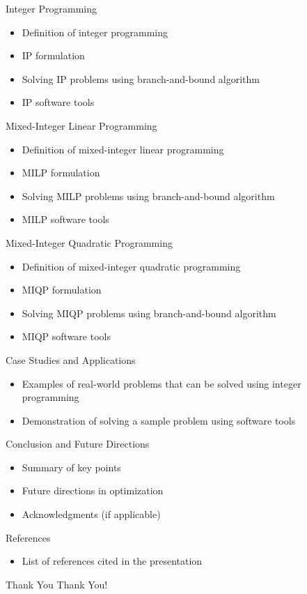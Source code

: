 \documentclass{beamer}
\begin{document}
\begin{frame}{Integer Programming}
  \begin{itemize}
    \item Definition of integer programming
    \item IP formulation
    \item Solving IP problems using branch-and-bound algorithm
    \item IP software tools
  \end{itemize}
\end{frame}

\begin{frame}{Mixed-Integer Linear Programming}
  \begin{itemize}
    \item Definition of mixed-integer linear programming
    \item MILP formulation
    \item Solving MILP problems using branch-and-bound algorithm
    \item MILP software tools
  \end{itemize}
\end{frame}

\begin{frame}{Mixed-Integer Quadratic Programming}
  \begin{itemize}
    \item Definition of mixed-integer quadratic programming
    \item MIQP formulation
    \item Solving MIQP problems using branch-and-bound algorithm
    \item MIQP software tools
  \end{itemize}
\end{frame}

\begin{frame}{Case Studies and Applications}
  \begin{itemize}
    \item Examples of real-world problems that can be solved using integer programming
    \item Demonstration of solving a sample problem using software tools
  \end{itemize}
\end{frame}

\begin{frame}{Conclusion and Future Directions}
  \begin{itemize}
    \item Summary of key points
    \item Future directions in optimization
    \item Acknowledgments (if applicable)
  \end{itemize}
\end{frame}

\begin{frame}{References}
  \begin{itemize}
    \item List of references cited in the presentation
  \end{itemize}
\end{frame}

\begin{frame}{Thank You}
  \centering
  \Huge Thank You!
\end{frame}
\end{document}
